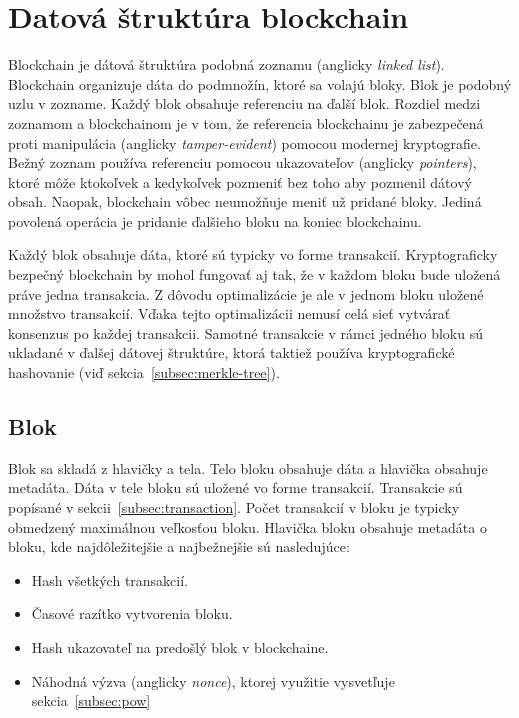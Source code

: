 \section{Datová štruktúra blockchain}\label{sec:data-struct-blockchain}
Blockchain je dátová štruktúra podobná zoznamu (anglicky \textit{linked list}). Blockchain organizuje dáta do podmnožín, ktoré sa volajú bloky. Blok je podobný uzlu v zozname. Každý blok obsahuje referenciu na ďalší blok. Rozdiel medzi zoznamom a blockchainom je v tom, že referencia blockchainu je zabezpečená proti manipulácia (anglicky \textit{tamper-evident}) pomocou modernej kryptografie. Bežný zoznam používa referenciu pomocou ukazovateľov (anglicky \textit{pointers}), ktoré môže ktokoľvek a kedykoľvek pozmeniť bez toho aby pozmenil dátový obsah. Naopak, blockchain vôbec neumožňuje meniť už pridané bloky. Jediná povolená operácia je pridanie ďalšieho bloku na koniec blockchainu.~\cite{horizenAcademy}

Každý blok obsahuje dáta, ktoré sú typicky vo forme transakcií. Kryptograficky bezpečný blockchain by mohol fungovať aj tak, že v každom bloku bude uložená práve jedna transakcia. Z dôvodu optimalizácie je ale v jednom bloku uložené množstvo transakcií. Vďaka tejto optimalizácii nemusí celá sieť vytvárať konsenzus po každej transakcii. Samotné transakcie v rámci jedného bloku sú ukladané v ďalšej dátovej štruktúre, ktorá taktiež používa kryptografické hashovanie (viď sekcia~\ref{subsec:merkle-tree}).~\cite{narayanan2016bitcoin}

\subsection{Blok}\label{subsec:block}

Blok sa skladá z hlavičky a tela. Telo bloku obsahuje dáta a hlavička obsahuje metadáta. Dáta v tele bloku sú uložené vo forme transakcií. Transakcie sú popísané v sekcii~\ref{subsec:transaction}. Počet transakcií v bloku je typicky obmedzený maximálnou veľkosťou bloku.
Hlavička bloku obsahuje metadáta o bloku, kde najdôležitejšie a najbežnejšie sú nasledujúce:
\begin{itemize}
	\item Hash všetkých transakcií.
	\item Časové razítko vytvorenia bloku.
	\item Hash ukazovateľ na predošlý blok v blockchaine.
	\item Náhodná výzva (anglicky \textit{nonce}), ktorej využitie vysvetľuje sekcia~\ref{subsec:pow}
\end{itemize} 

